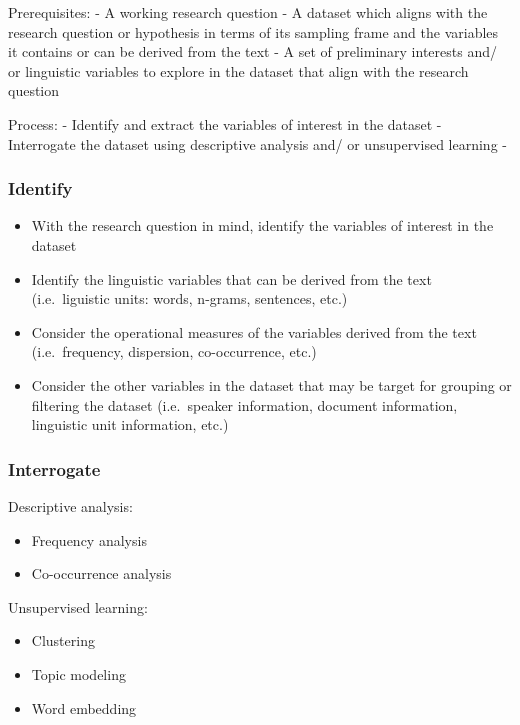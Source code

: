 \documentclass[
  letterpaper,
]{latex/krantz}
\providecommand{\tightlist}{%
  \setlength{\itemsep}{0pt}\setlength{\parskip}{0pt}}\usepackage{longtable,booktabs,array}
\begin{document}
Prerequisites: - A working research question - A dataset which aligns
with the research question or hypothesis in terms of its sampling frame
and the variables it contains or can be derived from the text - A set of
preliminary interests and/ or linguistic variables to explore in the
dataset that align with the research question

Process: - Identify and extract the variables of interest in the dataset
- Interrogate the dataset using descriptive analysis and/ or
unsupervised learning -

\hypertarget{eda-identify}{%
\subsubsection{Identify}\label{eda-identify}}

\begin{itemize}
\tightlist
\item
  With the research question in mind, identify the variables of interest
  in the dataset
\item
  Identify the linguistic variables that can be derived from the text
  (i.e.~liguistic units: words, n-grams, sentences, etc.)
\item
  Consider the operational measures of the variables derived from the
  text (i.e.~frequency, dispersion, co-occurrence, etc.)
\item
  Consider the other variables in the dataset that may be target for
  grouping or filtering the dataset (i.e.~speaker information, document
  information, linguistic unit information, etc.)
\end{itemize}

\hypertarget{eda-interrogate}{%
\subsubsection{Interrogate}\label{eda-interrogate}}

Descriptive analysis:

\begin{itemize}
\tightlist
\item
  Frequency analysis
\item
  Co-occurrence analysis
\end{itemize}

Unsupervised learning:

\begin{itemize}
\tightlist
\item
  Clustering
\item
  Topic modeling
\item
  Word embedding
\end{itemize}
\end{document}
